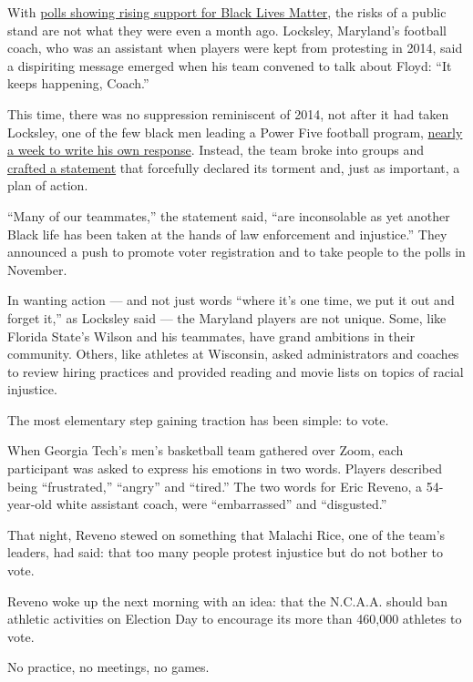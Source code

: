 With
\href{https://www.nytimes.com/interactive/2020/06/10/upshot/black-lives-matter-attitudes.html}{polls
showing rising support for Black Lives Matter}, the risks of a public
stand are not what they were even a month ago. Locksley, Maryland's
football coach, who was an assistant when players were kept from
protesting in 2014, said a dispiriting message emerged when his team
convened to talk about Floyd: ``It keeps happening, Coach.''

This time, there was no suppression reminiscent of 2014, not after it
had taken Locksley, one of the few black men leading a Power Five
football program,
\href{https://twitter.com/CoachLocks/status/1266761658334097408}{nearly
a week to write his own response}. Instead, the team broke into groups
and
\href{https://twitter.com/TerpsFootball/status/1267905585674158081}{crafted
a statement} that forcefully declared its torment and, just as
important, a plan of action.

``Many of our teammates,'' the statement said, ``are inconsolable as yet
another Black life has been taken at the hands of law enforcement and
injustice.'' They announced a push to promote voter registration and to
take people to the polls in November.

In wanting action --- and not just words ``where it's one time, we put
it out and forget it,'' as Locksley said --- the Maryland players are
not unique. Some, like Florida State's Wilson and his teammates, have
grand ambitions in their community. Others, like athletes at Wisconsin,
asked administrators and coaches to review hiring practices and provided
reading and movie lists on topics of racial injustice.

The most elementary step gaining traction has been simple: to vote.

When Georgia Tech's men's basketball team gathered over Zoom, each
participant was asked to express his emotions in two words. Players
described being ``frustrated,'' ``angry'' and ``tired.'' The two words
for Eric Reveno, a 54-year-old white assistant coach, were
``embarrassed'' and ``disgusted.''

That night, Reveno stewed on something that Malachi Rice, one of the
team's leaders, had said: that too many people protest injustice but do
not bother to vote.

Reveno woke up the next morning with an idea: that the N.C.A.A. should
ban athletic activities on Election Day to encourage its more than
460,000 athletes to vote.

No practice, no meetings, no games.

